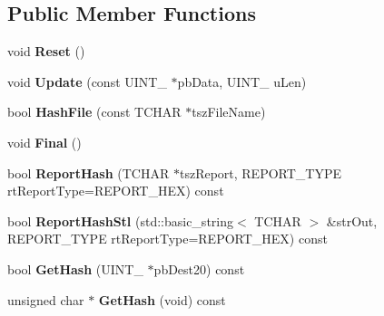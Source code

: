 \subsection*{Public Member Functions}
\begin{DoxyCompactItemize}
\item 
\hypertarget{class_c_s_h_a1_a2473fd69604fc762000247867830c2a0}{void {\bfseries Reset} ()}\label{class_c_s_h_a1_a2473fd69604fc762000247867830c2a0}

\item 
\hypertarget{class_c_s_h_a1_a59536022ba64be584aed79c28f78d84c}{void {\bfseries Update} (const U\-I\-N\-T\-\_ $\ast$pb\-Data, U\-I\-N\-T\-\_ u\-Len)}\label{class_c_s_h_a1_a59536022ba64be584aed79c28f78d84c}

\item 
\hypertarget{class_c_s_h_a1_afa6e97d87a9e5fbafd9f00f5267c85db}{bool {\bfseries Hash\-File} (const T\-C\-H\-A\-R $\ast$tsz\-File\-Name)}\label{class_c_s_h_a1_afa6e97d87a9e5fbafd9f00f5267c85db}

\item 
\hypertarget{class_c_s_h_a1_afbdaab3f2a2946d26a6144af3fec5fd8}{void {\bfseries Final} ()}\label{class_c_s_h_a1_afbdaab3f2a2946d26a6144af3fec5fd8}

\item 
\hypertarget{class_c_s_h_a1_a290089ec3f38863940c4757ebbdf4d6e}{bool {\bfseries Report\-Hash} (T\-C\-H\-A\-R $\ast$tsz\-Report, R\-E\-P\-O\-R\-T\-\_\-\-T\-Y\-P\-E rt\-Report\-Type=R\-E\-P\-O\-R\-T\-\_\-\-H\-E\-X) const }\label{class_c_s_h_a1_a290089ec3f38863940c4757ebbdf4d6e}

\item 
\hypertarget{class_c_s_h_a1_a31e5e1164c484945fb1f7dce969787e4}{bool {\bfseries Report\-Hash\-Stl} (std\-::basic\-\_\-string$<$ T\-C\-H\-A\-R $>$ \&str\-Out, R\-E\-P\-O\-R\-T\-\_\-\-T\-Y\-P\-E rt\-Report\-Type=R\-E\-P\-O\-R\-T\-\_\-\-H\-E\-X) const }\label{class_c_s_h_a1_a31e5e1164c484945fb1f7dce969787e4}

\item 
\hypertarget{class_c_s_h_a1_a736d60c74d29c605c5e62b3095ab7405}{bool {\bfseries Get\-Hash} (U\-I\-N\-T\-\_ $\ast$pb\-Dest20) const }\label{class_c_s_h_a1_a736d60c74d29c605c5e62b3095ab7405}

\item 
\hypertarget{class_c_s_h_a1_a4a7604d4885c21240820bb33520fb4f0}{unsigned char $\ast$ {\bfseries Get\-Hash} (void) const }\label{class_c_s_h_a1_a4a7604d4885c21240820bb33520fb4f0}

\end{DoxyCompactItemize}
